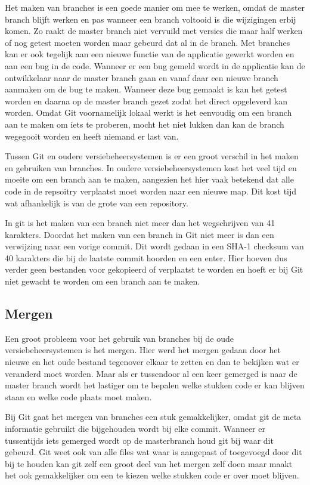 \documentclass[a4paper,11pt,oneside]{report}
\begin{document}
Het maken van branches is een goede manier om mee te werken, omdat de master
branch blijft werken en pas wanneer een branch voltooid is die wijzigingen erbij
komen. Zo raakt de master branch niet vervuild met versies die maar half werken
of nog getest moeten worden maar gebeurd dat al in de branch. Met branches kan
er ook tegelijk aan een nieuwe functie van de applicatie gewerkt worden en aan
een bug in de code. Wanneer er een bug gemeld wordt in de applicatie kan de
ontwikkelaar naar de master branch gaan en vanaf daar een nieuwe branch aanmaken
om de bug te maken. Wanneer deze bug gemaakt is kan het getest worden en daarna
op de master branch gezet zodat het direct opgeleverd kan worden. Omdat Git
voornamelijk lokaal werkt is het eenvoudig om een branch aan te maken om iets te
proberen, mocht het niet lukken dan kan de branch wegegooit worden en heeft
niemand er last van.

Tussen Git en oudere versiebeheersystemen is er een groot verschil in het maken
en gebruiken van branches. In oudere versiebeheersystemen kost het veel tijd en
moeite om een branch aan te maken, aangezien het hier vaak betekend dat alle
code in de repsoitry verplaatst moet worden naar een nieuwe map. Dit kost tijd
wat afhankelijk is van de grote van een repository.

In git is het maken van een branch niet meer dan het wegschrijven van 41
karakters. Doordat het maken van een branch in Git niet meer is dan een
verwijzing naar een vorige commit. Dit wordt gedaan in een SHA-1 checksum van 40
karakters die bij de laatste commit hoorden en een enter. Hier hoeven dus verder
geen bestanden voor gekopieerd of verplaatst te worden en hoeft er bij Git niet
gewacht te worden om een branch aan te maken.


\subsection{Mergen}
Een groot probleem voor het gebruik van branches bij de oude
versiebeheersystemen is het mergen. Hier werd het mergen gedaan door het nieuwe
en het oude bestand tegenover elkaar te zetten en dan te bekijken wat er
veranderd moet worden. Maar als er tussendoor al een keer gemerged is naar de
master branch wordt het lastiger om te bepalen welke stukken code er kan blijven
staan en welke code plaats moet maken.

Bij Git gaat het mergen van branches een stuk gemakkelijker, omdat git de meta
informatie gebruikt die bijgehouden wordt bij elke commit. Wanneer er
tussentijds iets gemerged wordt op de masterbranch houd git bij waar dit
gebeurd. Git weet ook van alle files wat waar is aangepast of toegevoegd door
dit bij te houden kan git zelf een groot deel van het mergen zelf doen maar
maakt het ook gemakkelijker om een te kiezen welke stukken code er over moet
blijven.
\end{document}
